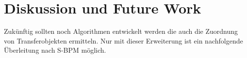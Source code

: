 %
%
% 
% 
% 


\chapter{Diskussion und Future Work}
\label{chap:Diskussion}


Zukünftig sollten noch Algorithmen entwickelt werden die auch die Zuordnung von Transferobjekten ermitteln. Nur mit dieser Erweiterung ist ein nachfolgende Überleitung nach S-BPM möglich. 